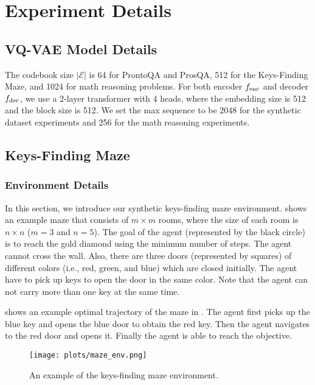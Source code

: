 \section{Experiment Details}
\label{app:model}

\subsection{VQ-VAE Model Details}
The codebook size $|\mathcal{E}|$ is 64 for ProntoQA and ProsQA, 512 for the Keys-Finding Maze, and 1024 for math reasoning problems. 
For both encoder ${f_\text{enc}}$ and decoder ${f_\text{dec}}$, we use a 2-layer transformer with 4 heads, where the embedding size is 512 and the block size is 512. We set the max sequence to be 2048 for the synthetic dataset experiments and 256 for the math reasoning experiments. 


\subsection{Keys-Finding Maze}
\label{app:maze}
\subsubsection{Environment Details}
In this section, we introduce our synthetic keys-finding maze environment.  shows an example maze that consists of $m \times m$ rooms, where the size of each room is $n \times n$ ($m = 3$ and $n = 5$). The goal of the agent (represented by the black circle) is to reach the gold diamond using the minimum number of steps. The agent cannot cross the wall. Also, there are three doors (represented by squares) of different colors (i.e., red, green, and blue) which are closed initially. The agent have to pick up keys to open the door in the same color. Note that the agent can not carry more than one key at the same time. 

 shows an example optimal trajectory of the maze in . The agent first picks up the blue key and opens the blue door to obtain the red key. Then the agent navigates to the red door and opens it. Finally the agent is able to reach the objective. 

\begin{figure}[H]
  \centering
  \texttt{[image: plots/maze\_env.png]}
  \caption{An example of the keys-finding maze environment. }
  \label{fig:maze_env}
\end{figure}

